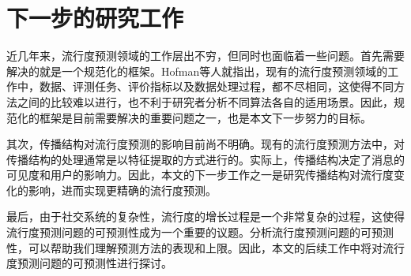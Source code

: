 \section{下一步的研究工作}
近几年来，流行度预测领域的工作层出不穷，但同时也面临着一些问题。首先需要解决的就是一个规范化的框架。Hofman等人\citep{hofman2017prediction}就指出，现有的流行度预测领域的工作中，数据、评测任务、评价指标以及数据处理过程，都不尽相同，这使得不同方法之间的比较难以进行，也不利于研究者分析不同算法各自的适用场景。因此，规范化的框架是目前需要解决的重要问题之一，也是本文下一步努力的目标。

其次，传播结构对流行度预测的影响目前尚不明确。现有的流行度预测方法中，对传播结构的处理通常是以特征提取的方式进行的。实际上，传播结构决定了消息的可见度和用户的影响力。因此，本文的下一步工作之一是研究传播结构对流行度变化的影响，进而实现更精确的流行度预测。

最后，由于社交系统的复杂性，流行度的增长过程是一个非常复杂的过程，这使得流行度预测问题的可预测性成为一个重要的议题。分析流行度预测问题的可预测性，可以帮助我们理解预测方法的表现和上限。因此，本文的后续工作中将对流行度预测问题的可预测性进行探讨。
